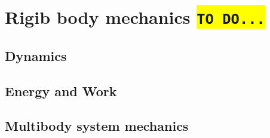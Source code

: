 \chapter{Rigib body mechanics \colorbox{yellow}{\texttt{TO DO...}}}
\section{Dynamics}
\section{Energy and Work}
\section{Multibody system mechanics}